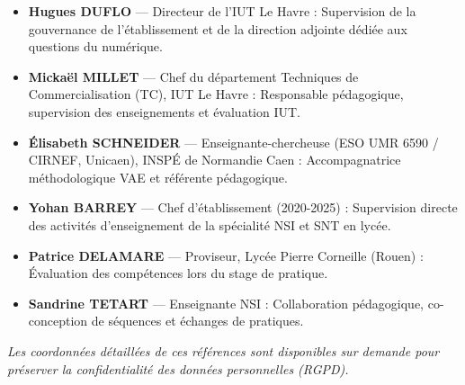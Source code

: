 \begin{itemize}[leftmargin=*]
    \item \textbf{Hugues DUFLO} — Directeur de l'IUT Le Havre : Supervision de la gouvernance de l'établissement et de la direction adjointe dédiée aux questions du numérique.
    \item \textbf{Mickaël MILLET} — Chef du département Techniques de Commercialisation (TC), IUT Le Havre : Responsable pédagogique, supervision des enseignements et évaluation IUT.
    \item \textbf{Élisabeth SCHNEIDER} — Enseignante-chercheuse (ESO UMR 6590 / CIRNEF, Unicaen), INSPÉ de Normandie Caen : Accompagnatrice méthodologique VAE et référente pédagogique.
    \item \textbf{Yohan BARREY} — Chef d'établissement (2020-2025) : Supervision directe des activités d'enseignement de la spécialité NSI et SNT en lycée.
    \item \textbf{Patrice DELAMARE} — Proviseur, Lycée Pierre Corneille (Rouen) : Évaluation des compétences lors du stage de pratique.
    \item \textbf{Sandrine TETART} — Enseignante NSI : Collaboration pédagogique, co-conception de séquences et échanges de pratiques.
\end{itemize}

\textit{Les coordonnées détaillées de ces références sont disponibles sur demande pour préserver la confidentialité des données personnelles (RGPD).}
